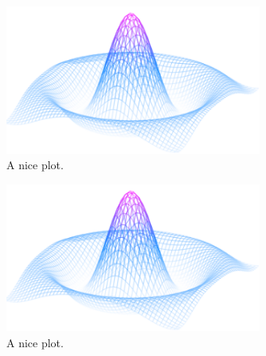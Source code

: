 \documentclass{article}
\begin{document}
\begin{figure}[b]
    \centering
    \includegraphics[width=0.75\textwidth]{mesh}
    \caption{A nice plot.}
\end{figure}

\begin{figure}[p]
    \centering
    \includegraphics[width=0.75\textwidth]{mesh}
    \caption{A nice plot.}
\end{figure}

\end{document}
